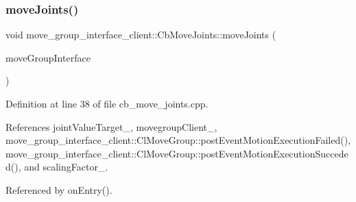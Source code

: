 \subsubsection{\texorpdfstring{move\+Joints()}{moveJoints()}}
{\footnotesize\ttfamily void move\+\_\+group\+\_\+interface\+\_\+client\+::\+Cb\+Move\+Joints\+::move\+Joints (\begin{DoxyParamCaption}\item[{moveit\+::planning\+\_\+interface\+::\+Move\+Group\+Interface \&}]{move\+Group\+Interface }\end{DoxyParamCaption})\hspace{0.3cm}{\ttfamily [protected]}}



Definition at line 38 of file cb\+\_\+move\+\_\+joints.\+cpp.



References joint\+Value\+Target\+\_\+, movegroup\+Client\+\_\+, move\+\_\+group\+\_\+interface\+\_\+client\+::\+Cl\+Move\+Group\+::post\+Event\+Motion\+Execution\+Failed(), move\+\_\+group\+\_\+interface\+\_\+client\+::\+Cl\+Move\+Group\+::post\+Event\+Motion\+Execution\+Succeded(), and scaling\+Factor\+\_\+.



Referenced by on\+Entry().


